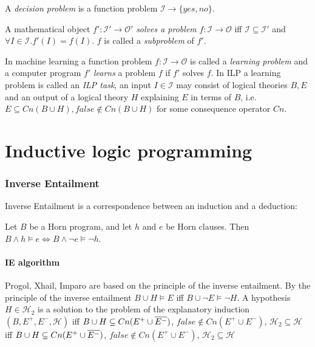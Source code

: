 \begin{defn}
A \emph{decision problem} is a function problem $\mathcal{I} \to \{yes, no\}$.
\end{defn}

\begin{defn}
A mathematical object $f':\mathcal{I}' \to \mathcal{O}'$ \emph{solves a problem} $f:\mathcal{I} \to \mathcal{O}$ iff $\mathcal{I} \subseteq \mathcal{I}'$ and
$\forall I \in \mathcal{I}. f'(I)=f(I)$.
$f$ is called a \emph{subproblem} of $f'$.
\end{defn}

In machine learning a function problem $f:\mathcal{I} \to \mathcal{O}$ is called a \emph{learning problem} and a computer program $f'$ \emph{learns} a problem $f$ if $f'$ solves $f$. In ILP a learning problem is called an \emph{ILP task}, an input $I \in \mathcal{I}$ may consist of logical theories $B, E$ and an output of a logical theory $H$ explaining $E$ in terms of $B$, i.e. $E \subseteq Cn(B \cup H), false \not\in Cn(B \cup H)$ for some consequence operator $Cn$.

\section{Inductive logic programming}

\subsubsection{Inverse Entailment}
Inverse Entailment is a correspondence between an induction and a deduction:
\begin{thm}\cite{kimber2012learning}
Let $B$ be a Horn program, and let $h$ and $e$ be
Horn clauses. Then $B \wedge h \models e \iff B \wedge \neg e \models \neg h$.
\end{thm}

\paragraph{IE algorithm\cite{yamamoto2012inverse}}\label{inverse_entailement_algorithm}
Progol, Xhail, Imparo are based on the principle of the inverse entailment. By the principle of the inverse entailment $B \cup H \models E$ iff
$B \cup \neg E \models \neg H$. A hypothesis $H \in \mathcal{H}_2$ is a solution to the problem of the explanatory induction $(B,E^{+},E^{-},\mathcal{H})$ iff
$B \cup H \subseteq Cn(E^{+} \cup \overline{E^{-}})$,
 $false \not\in Cn(E^{+} \cup E^{-})$, $\mathcal{H}_2 \subseteq \mathcal{H}$
iff
$B \cup H \subseteq Cn(E^{+} \cup \overline{E^{-}})$,
 $false \not\in Cn(E^{+} \cup E^{-})$, $\mathcal{H}_2 \subseteq \mathcal{H}$
 
